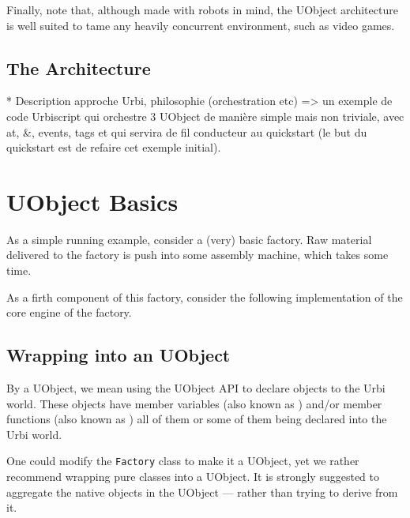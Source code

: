 Finally, note that, although made with robots in mind, the UObject
architecture is well suited to tame any heavily concurrent
environment, such as video games.

\subsection{The \urbi Architecture}

\begin{todo}
  * Description approche Urbi, philosophie (orchestration etc) => un
  exemple de code Urbiscript qui orchestre 3 UObject de manière simple
  mais non triviale, avec at, \&, events, tags et qui servira de fil
  conducteur au quickstart (le but du quickstart est de refaire cet
  exemple initial).
\end{todo}

\section{UObject Basics}

As a simple running example, consider a (very) basic factory.  Raw
material delivered to the factory is push into some assembly machine,
which takes some time.

As a firth component of this factory, consider the following
implementation of the core engine of the factory.
\newcommand{\factoryDir}{\uobjectsDir/factory/factory.uob}



\subsection{Wrapping into an UObject}

By  a UObject, we mean using the UObject API to declare
objects to the Urbi world.  These objects have member variables (also
known as ) and/or member functions (also known as
) all of them or some of them being declared into the
Urbi world.

One could modify the \lstinline|Factory| class to make it a UObject,
yet we rather recommend wrapping pure \Cxx classes into a UObject.  It
is strongly suggested to aggregate the native \Cxx objects in the
UObject --- rather than trying to derive from it.



